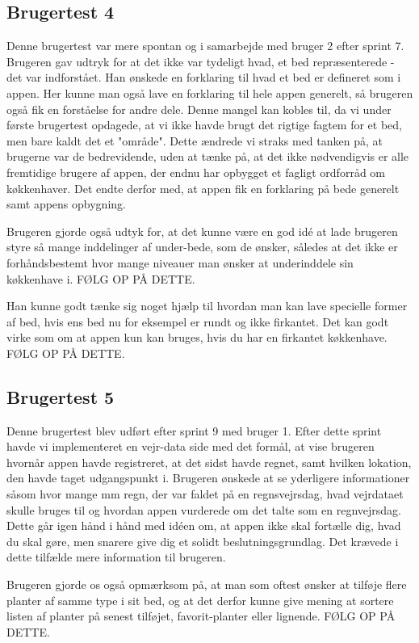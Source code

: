 \subsection{Brugertest 4}

Denne brugertest var mere spontan og i samarbejde med bruger 2 efter sprint 7. Brugeren gav udtryk for at det ikke var tydeligt hvad, et bed repræsenterede - det var indforstået. Han ønskede en forklaring til hvad et bed er defineret som i appen. Her kunne man også lave en forklaring til hele appen generelt, så brugeren også fik en forståelse for andre dele. Denne mangel kan kobles til, da vi under første brugertest opdagede, at vi ikke havde brugt det rigtige fagtem for et bed, men bare kaldt det et "område". Dette ændrede vi straks med tanken på, at brugerne var de bedrevidende, uden at tænke på, at det ikke nødvendigvis er alle fremtidige brugere af appen, der endnu har opbygget et fagligt ordforråd om køkkenhaver. Det endte derfor med, at appen fik en forklaring på bede generelt samt appens opbygning.

Brugeren gjorde også udtyk for, at det kunne være en god idé at lade brugeren styre så mange inddelinger af under-bede, som de ønsker, således at det ikke er forhåndsbestemt hvor mange niveauer man ønsker at underinddele sin køkkenhave i. FØLG OP PÅ DETTE.

Han kunne godt tænke sig noget hjælp til hvordan man kan lave specielle former af bed, hvis ens bed nu for eksempel er rundt og ikke firkantet. Det kan godt virke som om at appen kun kan bruges, hvis du har en firkantet køkkenhave. FØLG OP PÅ DETTE.

\subsection{Brugertest 5}
Denne brugertest blev udført efter sprint 9 med bruger 1. Efter dette sprint havde vi implementeret en vejr-data side med det formål, at vise brugeren hvornår appen havde registreret, at det sidst havde regnet, samt hvilken lokation, den havde taget udgangspunkt i. Brugeren ønskede at se yderligere informationer såsom hvor mange mm regn, der var faldet på en regnsvejrsdag, hvad vejrdataet skulle bruges til og hvordan appen vurderede om det talte som en regnvejrsdag. Dette går igen hånd i hånd med idéen om, at appen ikke skal fortælle dig, hvad du skal gøre, men snarere give dig et solidt beslutningsgrundlag. Det krævede i dette tilfælde mere information til brugeren.

Brugeren gjorde os også opmærksom på, at man som oftest ønsker at tilføje flere planter af samme type i sit bed, og at det derfor kunne give mening at sortere listen af planter på senest tilføjet, favorit-planter eller lignende. FØLG OP PÅ DETTE.

